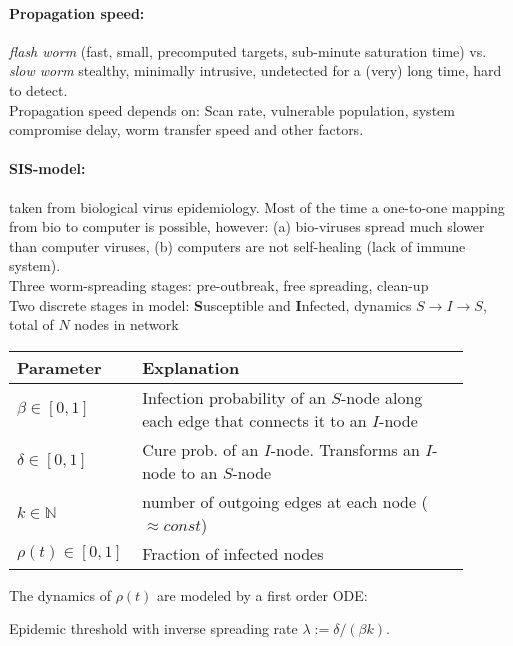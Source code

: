 \paragraph{Propagation speed:} \emph{flash worm} (fast, small, precomputed targets, sub-minute saturation time) vs. \emph{slow worm} stealthy, minimally intrusive, undetected for a (very) long time, hard to detect. \\
Propagation speed depends on:  Scan rate, vulnerable population, system compromise delay, worm transfer speed and other factors.

\paragraph{SIS-model:} taken from biological virus epidemiology. Most of the time a one-to-one mapping from bio to computer is possible, however: (a) bio-viruses spread much slower than computer viruses, (b) computers are not self-healing (lack of immune system). \\
Three worm-spreading stages: pre-outbreak, free spreading, clean-up \\
Two discrete stages in model: \textbf{S}usceptible and \textbf{I}nfected, dynamics $S \to I \to S$, total of $N$ nodes in network

\begin{tabular}{p{0.2\linewidth}p{0.7\linewidth}}
Parameter & Explanation \\
\hline
\hline
$\beta \in \left[0, 1\right]$ & Infection probability of an $S$-node along each edge that connects it to an $I$-node \\
$\delta \in \left[0, 1\right]$ & Cure prob. of an $I$-node. Transforms an $I$-node to an $S$-node \\
$k \in \mathbb{N}$ & number of outgoing edges at each node ($\approx const$)  \\
$\rho(t) \in \left[0, 1\right]$ & Fraction of infected nodes \\
\end{tabular}

The dynamics of $\rho(t)$ are modeled by a first order ODE:

Epidemic threshold
with inverse spreading rate $\lambda := \delta/(\beta k)$. 

